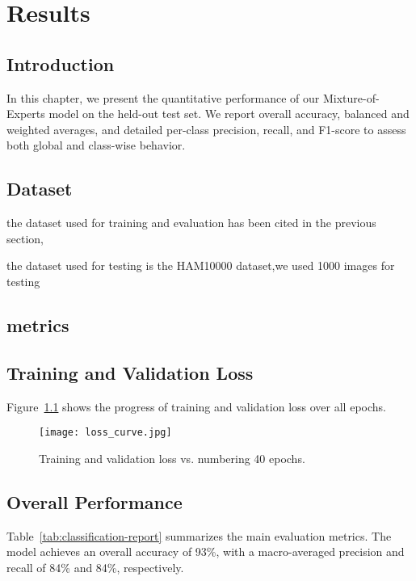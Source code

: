 \chapter{Results}
\clearpage
\label{chap:results}

\section{Introduction}
In this chapter, we present the quantitative performance of our Mixture-of-Experts model on the held-out test set. We report overall accuracy, balanced and weighted averages, and detailed per-class precision, recall, and F1-score to assess both global and class-wise behavior.
\section{Dataset}
the dataset used for training and evaluation has been cited in the previous section,

the dataset used for testing is the HAM10000 dataset,we used 1000 images for  testing  
\section{metrics}
\section{Training and Validation Loss}
Figure~\ref{fig:loss-curve} shows the progress of training and validation loss over all epochs.

\begin{figure}[h!]
  \centering
  \texttt{[image: loss\_curve.jpg]}
  \caption{Training and validation loss vs.
numbering 40 epochs.}
  \label{fig:loss-curve}
\end{figure}
\section{Overall Performance}
Table~\ref{tab:classification-report} summarizes the main evaluation metrics. The model achieves an overall accuracy of 93\%, with a macro-averaged precision and recall of 84\% and 84\%, respectively.

